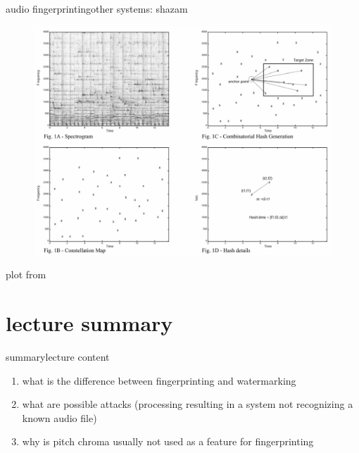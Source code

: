         \begin{frame}{audio fingerprinting}{other systems: shazam}
            \vspace{-3mm}
            \begin{figure}
                \centering
                \includegraphics[scale=.23]{graph/fingerprint_shazaam}
            \end{figure}
            plot from 
            
        \end{frame}



    \section[summary]{lecture summary}
        \begin{frame}{summary}{lecture content}
            \begin{enumerate}
                \item       what is the difference between fingerprinting and watermarking
                \smallskip
                \item<2->   what are possible attacks (processing resulting in a system not recognizing a known audio file)
                \smallskip
                \item<3->   why is pitch chroma usually not used as a feature for fingerprinting
            \end{enumerate}
        \end{frame}


